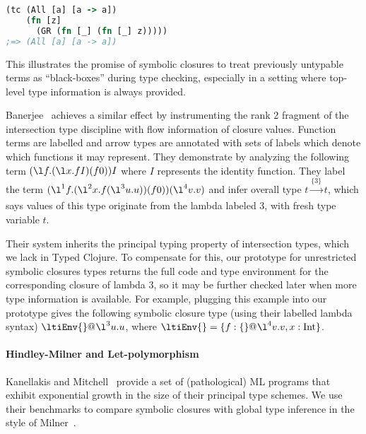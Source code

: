 \begin{lstlisting}[language=Clojure]
(tc (All [a] [a -> a])
    (fn [z]
      (GR (fn [_] (fn [_] z)))))
;=> (All [a] [a -> a])
\end{lstlisting}

This illustrates the promise of symbolic closures to treat previously untypable terms
as ``black-boxes'' during type checking, especially in a setting where top-level
type information is always provided.

Banerjee~\cite{banerjee1997modular}
achieves a similar effect by
instrumenting the rank 2 fragment of the intersection type discipline
with flow information of closure values.
Function terms are labelled and
arrow types are annotated with sets of labels which denote
which functions it may represent.
They demonstrate by analyzing the following term
$(\l f. (\l x. f I)(f 0))I$
where $I$ represents the identity function.
They label the term
$(\l^1 f. (\l^2 x. f (\l^3 u. u))(f 0))(\l^4 v. v)$
and infer overall type
$t \xrightarrow[]{\{3\}} t$,
which says values of this type originate from the lambda labeled $3$,
with fresh type variable $t$.

Their system inherits the principal typing property of intersection
types, which we lack in Typed Clojure.
To compensate for this, our prototype for unrestricted symbolic closures
types returns the full code and type environment for the corresponding closure
of lambda $3$, so it may
be further checked later when more type information is available.
For example, plugging this example into our prototype gives the
following symbolic closure type (using their labelled lambda syntax)
$\ltiClosure{\ltiEnv{}}{\l^3 u. u}$,
where $\ltiEnv{} = \{f : \ltiClosure{\{\}}{\l^4 v. v}, x : \text{Int}\}$.



\paragraph{Hindley-Milner and Let-polymorphism}
%
Kanellakis and Mitchell~\cite{kanellakis1989polymorphic}
provide a set of (pathological) ML programs that exhibit exponential
growth in the size of their principal type schemes.
We use their benchmarks to compare symbolic closures with
global type inference in the style of Milner~\cite{milner1978theory}.

